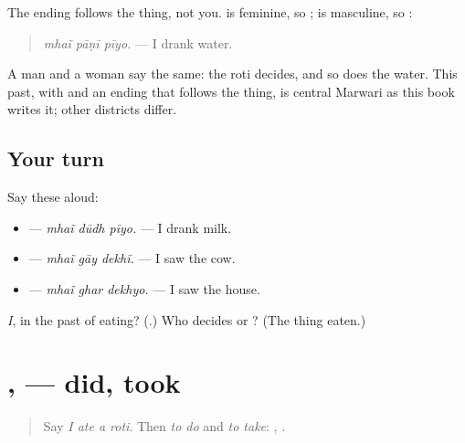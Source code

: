 \begin{grammarlens}[title={Grammar Lens: the thing decides}]
The ending follows the thing, not you. \textbf{} is feminine, so \textbf{}; \textbf{} is masculine, so \textbf{}:

\begin{quote}
\textbf{  }
\end{quote}

\begin{quote}
\emph{mhaĩ pāṇī pīyo.} — I drank water.
\end{quote}

A man and a woman say the same: the roti decides, and so does the water. This past, with \textbf{} and an ending that follows the thing, is central Marwari as this book writes it; other districts differ.
\end{grammarlens}

\subsection*{Your turn}
Say these aloud:

\begin{itemize}
\raggedright
  \item \textbf{  } — \emph{mhaĩ dūdh pīyo.} — I drank milk.
  \item \textbf{  } — \emph{mhaĩ gāy dekhī.} — I saw the cow.
  \item \textbf{  } — \emph{mhaĩ ghar dekhyo.} — I saw the house.
\end{itemize}

\begin{tcolorbox}[breakable,colback=teal!4,colframe=teal!35!black,title={Before you move on}]
\emph{I}, in the past of eating? (\textbf{}.) Who decides \textbf{} or \textbf{}? (The thing eaten.)
\end{tcolorbox}
\section[\texorpdfstring{\mw{कियो} · \mw{लियो} (kiyo · liyo)}{कियो · लियो (kiyo · liyo)}]{,  — did, took}

\label{lesson:MW-C161-kiyo-liyo}



\begin{quote}
Say \emph{I ate a roti}. Then \emph{to do} and \emph{to take}: \textbf{}, \textbf{}.
\end{quote}

